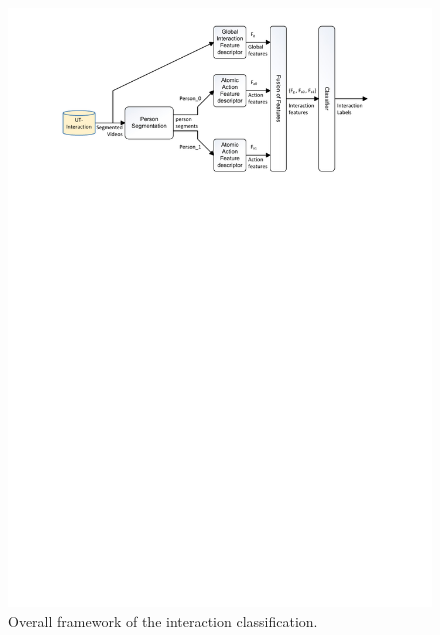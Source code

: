  \begin{figure}
 	\includegraphics[trim=2cm 21.5cm 0cm 1cm]{fig01/architecture.pdf}
 	\caption{Overall framework of the interaction classification. }
 	\label{fig:arch_classification}
 \end{figure}


